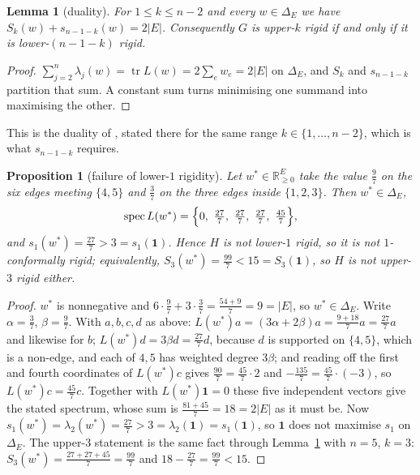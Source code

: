 \documentclass[11pt]{amsart}
\newtheorem{lemma}[theorem]{Lemma}
\newtheorem{proposition}[theorem]{Proposition}
\theoremstyle{remark}
\DeclareMathOperator{\tr}{tr}
\newcommand{\Real}{\mathbb R}
\newcommand{\DeltaE}{\Delta_E}
\newcommand{\Lop}{L}
\begin{document}
\begin{lemma}[duality]\label{lem:dual}
For $1\le k\le n-2$ and every $w\in\DeltaE$ we have $S_k(w)+s_{n-1-k}(w)=2|E|$.
Consequently $G$ is upper-$k$ rigid if and only if it is lower-$(n-1-k)$ rigid.
\end{lemma}

\begin{proof}
$\sum_{j=2}^{n}\lambda_j(w)=\tr\Lop(w)=2\sum_ew_e=2|E|$ on $\DeltaE$, and $S_k$ and
$s_{n-1-k}$ partition that sum. A constant sum turns minimising one summand into
maximising the other.
\end{proof}

This is the duality of \cite{ACG}, stated there for the same range
$k\in\{1,\dots,n-2\}$, which is what $s_{n-1-k}$ requires.

\begin{proposition}[failure of lower-$1$ rigidity]\label{prop:lower1}
Let $w^{*}\in\Real_{\ge0}^{E}$ take the value $\tfrac97$ on the six edges meeting
$\{4,5\}$ and $\tfrac37$ on the three edges inside $\{1,2,3\}$. Then $w^{*}\in\DeltaE$,
\[
 \operatorname{spec}\Lop(w^{*})=\Bigl\{0,\ \tfrac{27}{7},\ \tfrac{27}{7},\ \tfrac{27}{7},\ \tfrac{45}{7}\Bigr\},
\]
and $s_1(w^{*})=\tfrac{27}{7}>3=s_1(\mathbf 1)$. Hence $H$ is not lower-$1$ rigid, so it is
not $1$-conformally rigid; equivalently, $S_3(w^{*})=\tfrac{99}{7}<15=S_3(\mathbf 1)$, so
$H$ is not upper-$3$ rigid either.
\end{proposition}

\begin{proof}
$w^{*}$ is nonnegative and $6\cdot\tfrac97+3\cdot\tfrac37=\tfrac{54+9}{7}=9=|E|$, so
$w^{*}\in\DeltaE$. Write $\alpha=\tfrac37$, $\beta=\tfrac97$. With $a,b,c,d$ as above:
$\Lop(w^{*})a=(3\alpha+2\beta)a=\tfrac{9+18}{7}a=\tfrac{27}{7}a$ and likewise for $b$;
$\Lop(w^{*})d=3\beta d=\tfrac{27}{7}d$, because $d$ is supported on $\{4,5\}$, which is a
non-edge, and each of $4,5$ has weighted degree $3\beta$; and reading off the first and
fourth coordinates of $\Lop(w^{*})c$ gives $\tfrac{90}{7}=\tfrac{45}{7}\cdot2$ and
$-\tfrac{135}{7}=\tfrac{45}{7}\cdot(-3)$, so $\Lop(w^{*})c=\tfrac{45}{7}c$. Together with
$\Lop(w^{*})\mathbf 1=0$ these five independent vectors give the stated spectrum, whose sum
is $\tfrac{81+45}{7}=18=2|E|$ as it must be. Now
$s_1(w^{*})=\lambda_2(w^{*})=\tfrac{27}{7}>3=\lambda_2(\mathbf 1)=s_1(\mathbf 1)$, so
$\mathbf 1$ does not maximise $s_1$ on $\DeltaE$. The upper-$3$ statement is the same fact
through Lemma~\ref{lem:dual} with $n=5$, $k=3$: $S_3(w^{*})=\tfrac{27+27+45}{7}=\tfrac{99}{7}$
and $18-\tfrac{27}{7}=\tfrac{99}{7}<15$.
\end{proof}
\end{document}
